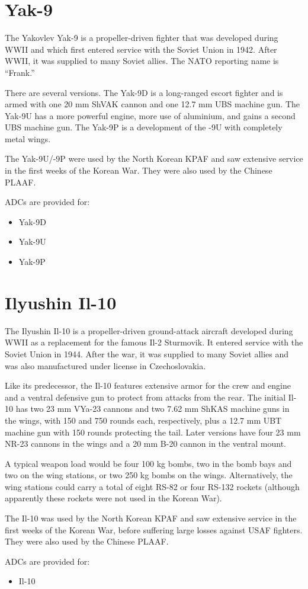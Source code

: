 \section*{Yak-9}

The Yakovlev Yak-9 is a propeller-driven fighter that was developed during WWII and which first entered service with the Soviet Union in 1942. After WWII, it was supplied to many Soviet allies. The NATO reporting name is “Frank.”

There are several versions. The Yak-9D is a long-ranged escort fighter and is armed with one 20 mm ShVAK cannon and one 12.7 mm UBS machine gun. The Yak-9U has a more powerful engine, more use of aluminium, and gains a second UBS machine gun. The Yak-9P is a development of the -9U with completely metal wings.

The Yak-9U/-9P were used by the North Korean KPAF and saw extensive service in the first weeks of the Korean War. They were also used by the Chinese PLAAF.

ADCs are provided for:
\begin{itemize}
\item Yak-9D
\item Yak-9U
\item Yak-9P
\end{itemize}

\section*{Ilyushin Il-10}

The Ilyushin Il-10 is a propeller-driven ground-attack aircraft developed during WWII as a replacement for the famous Il-2 Sturmovik. It entered service with the Soviet Union in 1944. After the war, it was supplied to many Soviet allies and was also manufactured under license in Czechoslovakia.

Like its predecessor, the Il-10 features extensive armor for the crew and engine and a ventral defensive gun to protect from attacks from the rear. The initial Il-10 has two 23 mm VYa-23 cannons and two 7.62 mm ShKAS machine guns in the wings, with 150 and 750 rounds each, respectively, plus a 12.7 mm UBT machine gun with 150 rounds protecting the tail. Later versions have four 23 mm NR-23 cannons in the wings and a 20 mm B-20 cannon in the ventral mount.

A typical weapon load would be four 100 kg bombs, two in the bomb bays and two on the wing stations, or two 250 kg bombs on the wings. Alternatively, the wing stations could carry a total of eight RS-82 or four RS-132 rockets (although apparently these rockets were not used in the Korean War).

The Il-10 was used by the North Korean KPAF and saw extensive service in the first weeks of the Korean War, before suffering large losses against USAF fighters. They were also used by the Chinese PLAAF.

ADCs are provided for:
\begin{itemize}
\item Il-10
\end{itemize}
